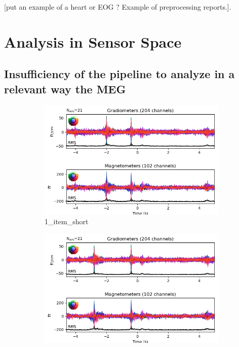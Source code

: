 [put an example of a heart or EOG ? Example of preprocessing reports.].

\section{Analysis in Sensor Space}

\subsection{Insufficiency of the pipeline to analyze in a relevant way the MEG}

\begin{figure}[htb]
    \centering %
    \begin{subfigure}{0.25\textwidth}
        \includegraphics[width=\linewidth]{images_report/sensor/evoked/1_item_short.png}
        \caption{1\_item\_short}
        \label{fig:1_item_short}
    \end{subfigure}\hfil %
    \begin{subfigure}{0.25\textwidth}
        \includegraphics[width=\linewidth]{images_report/sensor/evoked/1_item_medium.png}

\end{subfigure}
\end{figure}
